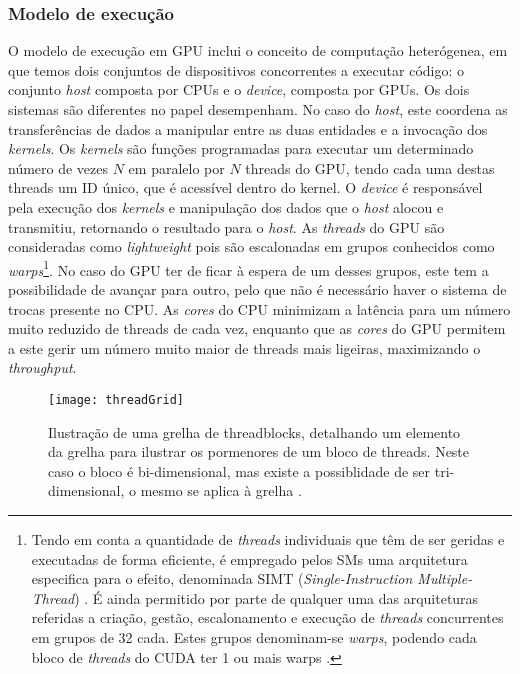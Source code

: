 \subsubsection{Modelo de execução}
\label{exec}
O modelo de execução em GPU inclui o conceito de computação heterógenea, em que temos dois conjuntos de dispositivos concorrentes a executar código: o conjunto \textit{host} composta por CPUs e o \textit{device}, composta por GPUs. Os dois sistemas são diferentes no papel desempenham. No caso do \textit{host}, este coordena as transferências de dados a manipular entre as duas entidades e a invocação dos \textit{kernels}.
Os \textit{kernels} são funções programadas para executar um determinado número de vezes $N$ em paralelo por $N$ threads do GPU, tendo cada uma destas threads um ID único, que é acessível dentro do kernel. O \textit{device} é responsável pela execução dos \textit{kernels} e manipulação dos dados que o \textit{host} alocou e transmitiu, retornando o resultado para o \textit{host}.
 As  \textit{threads} do GPU são consideradas como \textit{lightweight} pois são escalonadas em grupos conhecidos como \textit{warps}\cite{cudaProgGuide}\footnote[1] {Tendo em conta a quantidade de  \textit{threads} individuais que têm de ser geridas e executadas de forma eficiente, é empregado pelos SMs uma arquitetura especifica para o efeito, denominada SIMT (\textit{Single-Instruction Multiple-Thread}) \cite{nvidiaTesla}.
É ainda permitido por parte de qualquer uma das arquiteturas referidas a criação, gestão, escalonamento e execução de  \textit{threads} concurrentes em grupos de 32 cada. Estes grupos denominam-se \textit{warps}, podendo cada bloco de  \textit{threads} do CUDA ter 1 ou mais warps
\cite{nickolls2010gpu}.}. No caso do GPU ter de ficar à espera de um desses grupos, este tem a possibilidade de avançar para outro, pelo que não é necessário haver o sistema de trocas presente no CPU. As \textit{cores} do CPU minimizam a latência para um número muito reduzido de threads de cada vez, enquanto que as \textit{cores} do GPU permitem a este gerir um número muito maior de threads mais ligeiras, maximizando o \textit{throughput}.
  \begin{figure}[ht]
  \centering
    {\texttt{[image: threadGrid]}}
  \caption{Ilustração de uma grelha de threadblocks, detalhando um elemento da grelha para ilustrar os pormenores de um bloco de threads. Neste caso o bloco é bi-dimensional, mas existe a possiblidade de ser tri-dimensional, o mesmo se aplica à grelha \cite{cpg}.}
  \label{threadGrid}
\end{figure}
